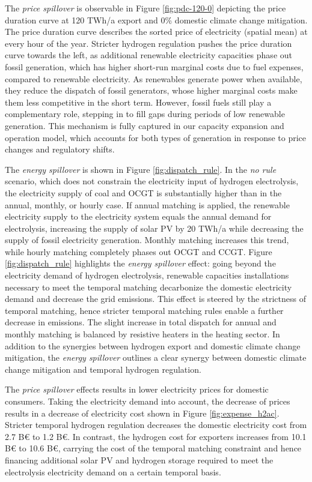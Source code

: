 The \textit{price spillover} is observable in Figure \ref{fig:pdc-120-0} depicting the price duration curve at 120 TWh/a export and 0\% domestic climate change mitigation. The price duration curve describes the sorted price of electricity (spatial mean) at every hour of the year.
Stricter hydrogen regulation pushes the price duration curve towards the left, as additional renewable electricity capacities phase out fossil generation, which has higher short-run marginal costs due to fuel expenses, compared to renewable electricity.
As renewables generate power when available, they reduce the dispatch of fossil generators, whose higher marginal costs make them less competitive in the short term. However, fossil fuels still play a complementary role, stepping in to fill gaps during periods of low renewable generation. This mechanism is fully captured in our capacity expansion and operation model, which accounts for both types of generation in response to price changes and regulatory shifts.


The \textit{energy spillover} is shown in Figure \ref{fig:dispatch_rule}. In the \textit{no rule} scenario, which does not constrain the electricity input of hydrogen electrolysis, the electricity supply of coal and OCGT is substantially higher than in the annual, monthly, or hourly case. If annual matching is applied, the renewable electricity supply to the electricity system equals the annual demand for electrolysis, increasing the supply of solar PV by 20 TWh/a while decreasing the supply of fossil electricity generation. 
Monthly matching increases this trend, while hourly matching completely phases out OCGT and CCGT. Figure \ref{fig:dispatch_rule} highlights the \textit{energy spillover} effect: going beyond the electricity demand of hydrogen electrolysis, renewable capacities installations necessary to meet the temporal matching decarbonize the domestic electricity demand and decrease the grid emissions. This effect is steered by the strictness of temporal matching, hence stricter temporal matching rules enable a further decrease in emissions.
The slight increase in total dispatch for annual and monthly matching is balanced by resistive heaters in the heating sector.
In addition to the synergies between hydrogen export and domestic climate change mitigation, the \textit{energy spillover} outlines a clear synergy between domestic climate change mitigation and temporal hydrogen regulation.



The \textit{price spillover} effects results in lower electricity prices for domestic consumers. Taking the electricity demand into account, the decrease of prices results in a decrease of electricity cost shown in 
Figure \ref{fig:expense_h2ac}. Stricter temporal hydrogen regulation decreases the domestic electricity cost from 2.7 B€ to 1.2 B€. In contrast, the hydrogen cost for exporters increases from 10.1 B€ to 10.6 B€, carrying the cost of the temporal matching constraint and hence financing additional solar PV and hydrogen storage required to meet the electrolysis electricity demand on a certain temporal basis.

